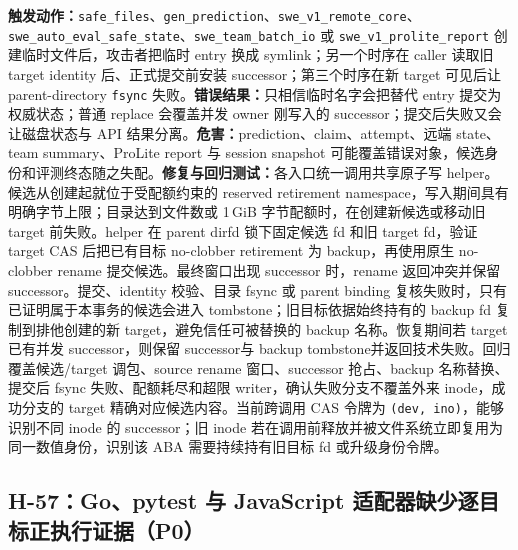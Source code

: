 \documentclass[11pt,a4paper,fontset=fandol]{ctexart}
\newcommand{\code}[1]{\texttt{#1}}
\begin{document}
\textbf{触发动作：}\code{safe\_files}、\code{gen\_prediction}、\code{swe\_v1\_remote\_core}、\code{swe\_auto\_eval\_safe\_state}、\code{swe\_team\_batch\_io} 或 \code{swe\_v1\_prolite\_report} 创建临时文件后，攻击者把临时 entry 换成 symlink；另一个时序在 caller 读取旧 target identity 后、正式提交前安装 successor；第三个时序在新 target 可见后让 parent-directory \code{fsync} 失败。\textbf{错误结果：}只相信临时名字会把替代 entry 提交为权威状态；普通 replace 会覆盖并发 owner 刚写入的 successor；提交后失败又会让磁盘状态与 API 结果分离。\textbf{危害：}prediction、claim、attempt、远端 state、team summary、ProLite report 与 session snapshot 可能覆盖错误对象，候选身份和评测终态随之失配。\textbf{修复与回归测试：}各入口统一调用共享原子写 helper。候选从创建起就位于受配额约束的 reserved retirement namespace，写入期间具有明确字节上限；目录达到文件数或 1\,GiB 字节配额时，在创建新候选或移动旧 target 前失败。helper 在 parent dirfd 锁下固定候选 fd 和旧 target fd，验证 target CAS 后把已有目标 no-clobber retirement 为 backup，再使用原生 no-clobber rename 提交候选。最终窗口出现 successor 时，rename 返回冲突并保留 successor。提交、identity 校验、目录 fsync 或 parent binding 复核失败时，只有已证明属于本事务的候选会进入 tombstone；旧目标依据始终持有的 backup fd 复制到排他创建的新 target，避免信任可被替换的 backup 名称。恢复期间若 target 已有并发 successor，则保留 successor与 backup tombstone并返回技术失败。回归覆盖候选/target 调包、source rename 窗口、successor 抢占、backup 名称替换、提交后 fsync 失败、配额耗尽和超限 writer，确认失败分支不覆盖外来 inode，成功分支的 target 精确对应候选内容。当前跨调用 CAS 令牌为 \code{(dev, ino)}，能够识别不同 inode 的 successor；旧 inode 若在调用前释放并被文件系统立即复用为同一数值身份，识别该 ABA 需要持续持有旧目标 fd 或升级身份令牌。

\subsection{H-57：Go、pytest 与 JavaScript 适配器缺少逐目标正执行证据（P0）}
\end{document}
